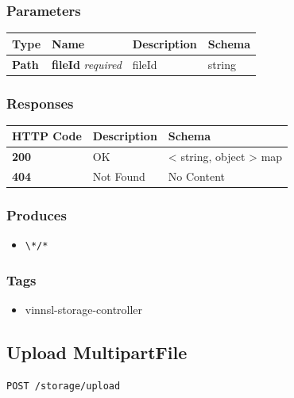 \subsubsection{Parameters}\label{parameters-16}

\begin{longtable}[]{@{}llll@{}}
\toprule
Type & Name & Description & Schema\tabularnewline
\midrule
\endhead
\textbf{Path} & \textbf{fileId} \emph{required} & fileId &
string\tabularnewline
\bottomrule
\end{longtable}

\subsubsection{Responses}\label{responses-20}

\begin{longtable}[]{@{}lll@{}}
\toprule
HTTP Code & Description & Schema\tabularnewline
\midrule
\endhead
\textbf{200} & OK & \textless{} string, object \textgreater{}
map\tabularnewline
\textbf{404} & Not Found & No Content\tabularnewline
\bottomrule
\end{longtable}

\subsubsection{Produces}\label{produces-20}

\begin{itemize}
\tightlist
\item
  \texttt{\textbackslash{}*/*}
\end{itemize}

\subsubsection{Tags}\label{tags-20}

\begin{itemize}
\tightlist
\item
  vinnsl-storage-controller
\end{itemize}

\subsection{Upload MultipartFile}\label{upload-multipartfile}

\begin{verbatim}
POST /storage/upload
\end{verbatim}

